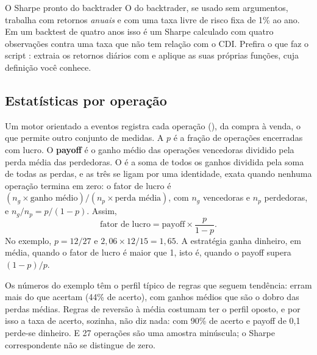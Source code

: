 \begin{armadilha}{O Sharpe pronto do backtrader}
O   do backtrader, se usado sem argumentos, trabalha com retornos \emph{anuais} e com uma taxa livre de risco fixa de 1\% ao ano. Em um backtest de quatro anos isso é um Sharpe calculado com quatro observações contra uma taxa que não tem relação com o CDI. Prefira o que faz o script : extraia os retornos diários com  e aplique as suas próprias funções, cuja definição você conhece.
\end{armadilha}

\subsection{Estatísticas por operação}

Um motor orientado a eventos registra cada operação (), da compra à venda, o que permite outro conjunto de medidas. A  $p$ é a fração de operações encerradas com lucro. O \textbf{payoff} é o ganho médio das operações vencedoras dividido pela perda média das perdedoras. O  é a soma de todos os ganhos dividida pela soma de todas as perdas, e as três se ligam por uma identidade, exata quando nenhuma operação termina em zero: o fator de lucro é $(n_g \times \text{ganho médio})/(n_p \times \text{perda média})$, com $n_g$ vencedoras e $n_p$ perdedoras, e $n_g/n_p = p/(1-p)$. Assim,
\begin{equation}
  \text{fator de lucro} = \text{payoff} \times \frac{p}{1-p} .
  \label{eq:c10-fator-lucro}
\end{equation}
No exemplo, $p = 12/27$ e $2,06 \times 12/15 = 1,65$. A estratégia ganha dinheiro, em média, quando o fator de lucro é maior que 1, isto é, quando o payoff supera $(1-p)/p$.

Os números do exemplo têm o perfil típico de regras que seguem tendência: erram mais do que acertam (44\% de acerto), com ganhos médios que são o dobro das perdas médias. Regras de reversão à média costumam ter o perfil oposto, e por isso a taxa de acerto, sozinha, não diz nada: com 90\% de acerto e payoff de 0,1 perde-se dinheiro. E 27 operações são uma amostra minúscula; o Sharpe correspondente não se distingue de zero.

